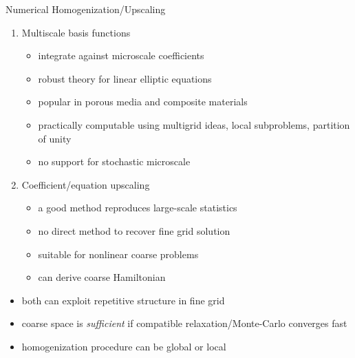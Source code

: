\begin{frame}{Numerical Homogenization/Upscaling}
  \begin{enumerate}
  \item Multiscale basis functions
    \begin{itemize}
    \item integrate against microscale coefficients
    \item robust theory for linear elliptic equations
    \item popular in porous media and composite materials
    \item practically computable using multigrid ideas, local subproblems, partition of unity
    \item no support for stochastic microscale
    \end{itemize}
  \item Coefficient/equation upscaling
    \begin{itemize}
    \item a good method reproduces large-scale statistics
    \item no direct method to recover fine grid solution
    \item suitable for nonlinear coarse problems
    \item can derive coarse Hamiltonian
    \end{itemize}
  \end{enumerate}
  \begin{itemize}
  \item both can exploit repetitive structure in fine grid
  \item coarse space is \emph{sufficient} if compatible relaxation/Monte-Carlo converges fast
  \item homogenization procedure can be global or local
  \end{itemize}
\end{frame}
